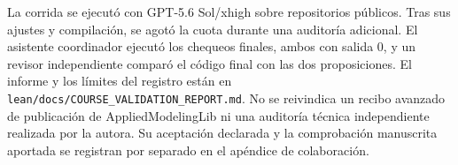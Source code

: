 La corrida se ejecutó con GPT-5.6 Sol/xhigh sobre repositorios públicos. Tras sus ajustes y compilación, se agotó la cuota durante una auditoría adicional. El asistente coordinador ejecutó los chequeos finales, ambos con salida 0, y un revisor independiente comparó el código final con las dos proposiciones. El informe y los límites del registro están en \texttt{lean/docs/COURSE\_VALIDATION\_REPORT.md}. No se reivindica un recibo avanzado de publicación de AppliedModelingLib ni una auditoría técnica independiente realizada por la autora. Su aceptación declarada y la comprobación manuscrita aportada se registran por separado en el apéndice de colaboración.
